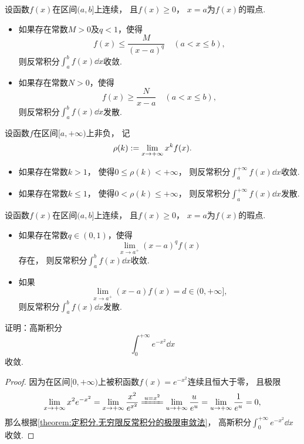 \begin{theorem}[比较审敛法2]\label{theorem:定积分.无界函数的反常积分的比较审敛法}
设函数\(f(x)\)在区间\((a,b]\)上连续，
且\(f(x) \geq 0\)，
\(x=a\)为\(f(x)\)的瑕点.
\begin{itemize}
	\item 如果存在常数\(M > 0\)及\(q < 1\)，使得\[
		f(x) \leq \frac{M}{(x-a)^q}
		\quad(a < x \leq b),
	\]
	则反常积分\(\int_a^b f(x) \dd{x}\)收敛.
	\item 如果存在常数\(N > 0\)，使得\[
		f(x) \geq \frac{N}{x - a}
		\quad(a < x \leq b),
	\]
	则反常积分\(\int_a^b f(x) \dd{x}\)发散.
\end{itemize}
\end{theorem}

\begin{theorem}[极限审敛法1]\label{theorem:定积分.无穷限反常积分的极限审敛法}
设函数\(f\)在区间\([a,+\infty)\)上非负，
记\[
	\rho(k) := \lim_{x\to+\infty} x^k f(x).
\]
\begin{itemize}
	\item 如果存在常数\(k > 1\)，
	使得\(0 \leq \rho(k) < +\infty\)，
	则反常积分\(\int_a^{+\infty} f(x) \dd{x}\)收敛.
	\item 如果存在常数\(k \leq 1\)，
	使得\(0 < \rho(k) \leq +\infty\)，
	则反常积分\(\int_a^{+\infty} f(x) \dd{x}\)发散.
\end{itemize}
\end{theorem}

\begin{theorem}[极限审敛法2]\label{theorem:定积分.无界函数的反常积分的极限审敛法}
设函数\(f(x)\)在区间\((a,b]\)上连续，
且\(f(x) \geq 0\)，
\(x=a\)为\(f(x)\)的瑕点.
\begin{itemize}
	\item 如果存在常数\(q \in (0,1)\)，使得\[
		\lim_{x \to a^+} (x-a)^q f(x)
	\]存在，
	则反常积分\(\int_a^b f(x) \dd{x}\)收敛.
	\item 如果\[
		\lim_{x \to a^+} (x-a) f(x) = d \in (0,+\infty],
	\]
	则反常积分\(\int_a^b f(x) \dd{x}\)发散.
\end{itemize}
\end{theorem}

\begin{example}\label{example:定积分.高斯积分的收敛性}
证明：高斯积分\[
	\int_0^{+\infty} e^{-x^2} \dd{x}
\]收敛.
\begin{proof}
因为在区间\([0,+\infty)\)上被积函数\(f(x) = e^{-x^2}\)连续且恒大于零，
且极限\[
	\lim_{x\to+\infty} x^2 e^{-x^2}
	= \lim_{x\to+\infty} \frac{x^2}{e^{x^2}}
	\xlongequal{u=x^2} \lim_{u\to+\infty} \frac{u}{e^u}
	= \lim_{u\to+\infty} \frac{1}{e^u}
	= 0,
\]
那么根据\cref{theorem:定积分.无穷限反常积分的极限审敛法}，
高斯积分\(\int_0^{+\infty} e^{-x^2} \dd{x}\)收敛.
\end{proof}
\end{example}

